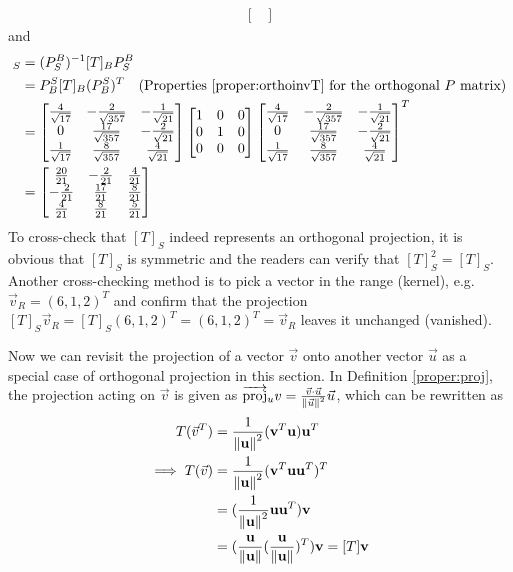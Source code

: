 \begin{solution}
\begin{align*}
\begin{bmatrix}
\end{bmatrix}
\end{align*}
and
\begin{align*}
[T]_S &= (P_S^B)^{-1} [T]_B P_S^B \\
&= P_B^S [T]_B (P_B^S)^T \text{\quad (Properties \ref{proper:orthoinvT} for the orthogonal $P$ matrix)} \\
&=
\begin{bmatrix}
\frac{4}{\sqrt{17}} & -\frac{2}{\sqrt{357}} & -\frac{1}{\sqrt{21}} \\
0 & \frac{17}{\sqrt{357}} & -\frac{2}{\sqrt{21}} \\
\frac{1}{\sqrt{17}} & \frac{8}{\sqrt{357}} & \frac{4}{\sqrt{21}}
\end{bmatrix}
\begin{bmatrix}
1 & 0 & 0 \\
0 & 1 & 0 \\
0 & 0 & 0
\end{bmatrix}
\begin{bmatrix}
\frac{4}{\sqrt{17}} & -\frac{2}{\sqrt{357}} & -\frac{1}{\sqrt{21}} \\
0 & \frac{17}{\sqrt{357}} & -\frac{2}{\sqrt{21}} \\
\frac{1}{\sqrt{17}} & \frac{8}{\sqrt{357}} & \frac{4}{\sqrt{21}}
\end{bmatrix}^T \\
&=
\begin{bmatrix}
\frac{20}{21}&-\frac{2}{21}&\frac{4}{21}\\ 
-\frac{2}{21}&\frac{17}{21}&\frac{8}{21}\\ 
\frac{4}{21}&\frac{8}{21}&\frac{5}{21}
\end{bmatrix}
\end{align*}
To cross-check that $[T]_S$ indeed represents an orthogonal projection, it is obvious that $[T]_S$ is symmetric and the readers can verify that $[T]_S^2 = [T]_S$. Another cross-checking method is to pick a vector in the range (kernel), e.g. $\vec{v}_R = (6,1,2)^T$ and confirm that the projection $[T]_S\vec{v}_R = [T]_S(6,1,2)^T = (6,1,2)^T = \vec{v}_R$ leaves it unchanged (vanished).
\end{solution}
Now we can revisit the projection of a vector $\vec{v}$ onto another vector $\vec{u}$ as a special case of orthogonal projection in this section. In Definition \ref{proper:proj}, the projection acting on $\vec{v}$ is given as $\overrightarrow{\text{proj}}_u v = \frac{\vec{v} \cdot \vec{u}}{\norm{\vec{u}}^2} \vec{u}$, which can be rewritten as
\begin{align*}
T(\vec{v}^T) &= \frac{1}{\norm{\textbf{u}}^2}(\textbf{v}^T\textbf{u})\textbf{u}^T \\
\implies T(\vec{v}) &= \frac{1}{\norm{\textbf{u}}^2}(\textbf{v}^T\textbf{u}\textbf{u}^T)^T \\
&= (\frac{1}{\norm{\textbf{u}}^2}\textbf{u}\textbf{u}^T)\textbf{v} \\
&= (\frac{\textbf{u}}{\norm{\textbf{u}}}(\frac{\textbf{u}}{\norm{\textbf{u}}})^T)\textbf{v} = [T]\textbf{v}
\end{align*}
